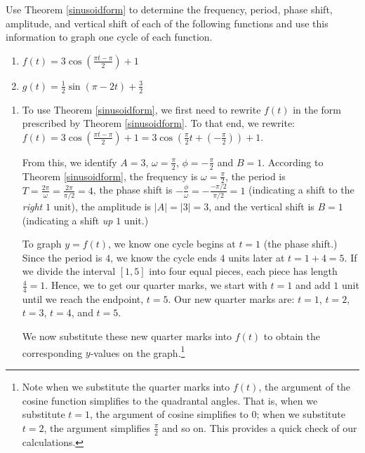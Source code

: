 \documentclass{ximera}
\begin{document}
\begin{example}  \label{cosinesinegraphex2} Use Theorem \ref{sinusoidform} to determine the frequency,  period, phase shift,  amplitude, and vertical shift of each of the following functions and use this information to graph one cycle of each function. 

\begin{enumerate}

\item  $f(t) = 3 \cos\left(\frac{\pi t - \pi}{2}\right) + 1$

\item  $g(t) = \frac{1}{2} \sin(\pi - 2t) + \frac{3}{2}$

\end{enumerate}

\begin{explanation}

\begin{enumerate}

\item   To use Theorem \ref{sinusoidform}, we first need to rewrite $f(t)$ in the form prescribed by Theorem \ref{sinusoidform}. To that end, we rewrite: $f(t) =  3 \cos\left(\frac{\pi t - \pi}{2}\right) + 1 = 3\cos\left(\frac{\pi}{2} t + \left(-\frac{\pi}{2}\right)\right) + 1$.

From this, we identify  $A = 3$, $\omega = \frac{\pi}{2}$, $\phi = -\frac{\pi}{2}$ and $B = 1$.  According to Theorem \ref{sinusoidform}, the frequency  is $\omega = \frac{\pi}{2}$,  the period  is $T=\frac{2\pi}{\omega} = \frac{2\pi}{\pi/2} = 4$, the phase shift is $-\frac{\phi}{\omega} = -\frac{-\pi/2}{\pi/2} = 1$ (indicating a shift to the \textit{right} $1$ unit),  the amplitude  is $|A| = |3| = 3$,  and the vertical shift is $B = 1$ (indicating a shift \textit{up} $1$ unit.) 



To graph $y = f(t)$, we know one cycle begins at $t=1$ (the phase shift.) Since the period is $4$, we know the cycle ends $4$ units later at $t=1+4 = 5$.  If we divide the interval $[1,5]$ into four equal pieces, each piece has length $\frac{4}{4} = 1$.  Hence, we to get our quarter marks, we start with $t=1$ and add $1$ unit until we reach the endpoint, $t=5$.  Our new quarter marks are:  $t=1$, $t=2$, $t=3$, $t=4$, and $t=5$.  



We now substitute these new quarter marks into $f(t)$ to obtain the corresponding $y$-values on the graph.\footnote{Note when we substitute the quarter marks into $f(t)$, the argument of the cosine function simplifies to the quadrantal angles.  That is, when we substitute $t=1$, the argument of cosine simplifies  to $0$; when we substitute $t=2$, the argument simplifies  $\frac{\pi}{2}$ and so on.  This provides a quick check of our calculations.}  




\end{enumerate}
\end{explanation}
\end{example}
\end{document}
